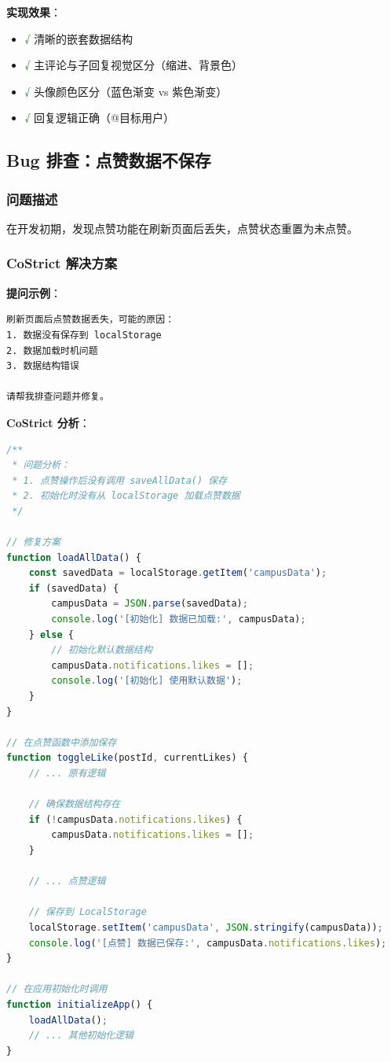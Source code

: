 ﻿\documentclass[12pt,a4paper]{article}
\begin{document}
\textbf{实现效果}：
\begin{itemize}
    \item \textcolor{green}{√} 清晰的嵌套数据结构
    \item \textcolor{green}{√} 主评论与子回复视觉区分（缩进、背景色）
    \item \textcolor{green}{√} 头像颜色区分（蓝色渐变 vs 紫色渐变）
    \item \textcolor{green}{√} 回复逻辑正确（@目标用户）
\end{itemize}

\subsection{Bug 排查：点赞数据不保存}

\subsubsection{问题描述}

在开发初期，发现点赞功能在刷新页面后丢失，点赞状态重置为未点赞。

\subsubsection{CoStrict 解决方案}

\textbf{提问示例}：
\begin{verbatim}
刷新页面后点赞数据丢失，可能的原因：
1. 数据没有保存到 localStorage
2. 数据加载时机问题
3. 数据结构错误

请帮我排查问题并修复。
\end{verbatim}

\textbf{CoStrict 分析}：

\begin{lstlisting}[language=JavaScript, caption={数据保存问题修复}]
/**
 * 问题分析：
 * 1. 点赞操作后没有调用 saveAllData() 保存
 * 2. 初始化时没有从 localStorage 加载点赞数据
 */

// 修复方案
function loadAllData() {
    const savedData = localStorage.getItem('campusData');
    if (savedData) {
        campusData = JSON.parse(savedData);
        console.log('[初始化] 数据已加载:', campusData);
    } else {
        // 初始化默认数据结构
        campusData.notifications.likes = [];
        console.log('[初始化] 使用默认数据');
    }
}

// 在点赞函数中添加保存
function toggleLike(postId, currentLikes) {
    // ... 原有逻辑
    
    // 确保数据结构存在
    if (!campusData.notifications.likes) {
        campusData.notifications.likes = [];
    }
    
    // ... 点赞逻辑
    
    // 保存到 LocalStorage
    localStorage.setItem('campusData', JSON.stringify(campusData));
    console.log('[点赞] 数据已保存:', campusData.notifications.likes);
}

// 在应用初始化时调用
function initializeApp() {
    loadAllData();
    // ... 其他初始化逻辑
}
\end{lstlisting}
\end{document}
